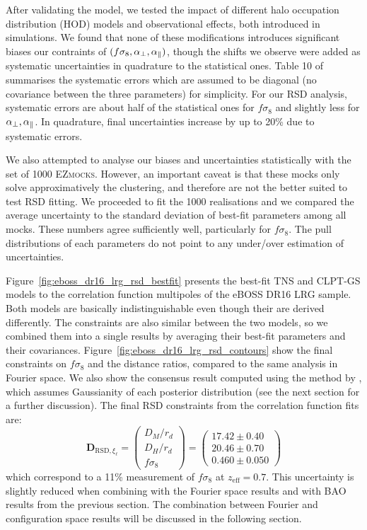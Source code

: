 After validating the model, we tested the impact of different halo occupation distribution (HOD) models 
and observational effects, both introduced in simulations. We found that none of these modifications 
introduces significant biases our contraints of $(f\sigma_8, {\alpha_\perp}, {\alpha_\parallel})$, though the shifts we observe 
were added as systematic uncertainties in quadrature to the statistical ones. 
Table 10 of \cite{bautistaCompletedSDSSIVExtended2021} summarises the systematic errors which are assumed to be
diagonal (no covariance between the three parameters) for simplicity. For our RSD analysis, 
systematic errors are about half of the statistical ones for $f\sigma_8$ and slightly less for ${\alpha_\perp}, {\alpha_\parallel}$. 
In quadrature, final uncertainties increase by up to 20\% due to systematic errors. 

We also attempted to analyse our biases and uncertainties statistically with the set of 1000 \textsc{EZmocks}. 
However, an important caveat is that these mocks only solve approximatively the clustering, and therefore are not 
the better suited to test RSD fitting. We proceeded to fit the 1000 realisations and we compared 
the average uncertainty to the standard deviation of best-fit parameters among all mocks. These numbers 
agree sufficiently well, particularly for $f\sigma_8$. The pull distributions of each parameters do not 
point to any under/over estimation of uncertainties.  

Figure~\ref{fig:eboss_dr16_lrg_rsd_bestfit} presents the best-fit TNS and CLPT-GS models to the correlation function 
multipoles of the eBOSS DR16 LRG sample. 
Both models are basically indistinguishable even though their are derived differently. The constraints are also 
similar between the two models, so we combined them into a single results by averaging their best-fit parameters 
and their covariances. 
Figure~\ref{fig:eboss_dr16_lrg_rsd_contours} show the final constraints on $f\sigma_8$ and the distance ratios, 
compared to the same analysis in Fourier space. We also show the consensus result computed using the method 
by \cite{sanchezClusteringGalaxiesCompleted2017a}, which assumes Gaussianity of each posterior distribution 
(see the next section for a further discussion). 
The final RSD constraints from the correlation function fits are:
\begin{equation}
    \mathbf{D}_{\text{RSD}, {\xi_\ell}} =  
    \begin{pmatrix}
   D_M/r_d \\
   D_H/r_d \\
   f\sigma_8 
    \end{pmatrix}=
    \begin{pmatrix}
    17.42 \pm 0.40 \\
    20.46 \pm 0.70 \\
    0.460 \pm 0.050
    \end{pmatrix}
\end{equation}
which correspond to a 11\% measurement of $f\sigma_8$ at $z_\text{eff} = 0.7$. 
This uncertainty is slightly reduced when combining with the Fourier space results 
and with BAO results from the previous section. 
The combination between Fourier and configuration space results
will be discussed in the following section. 

